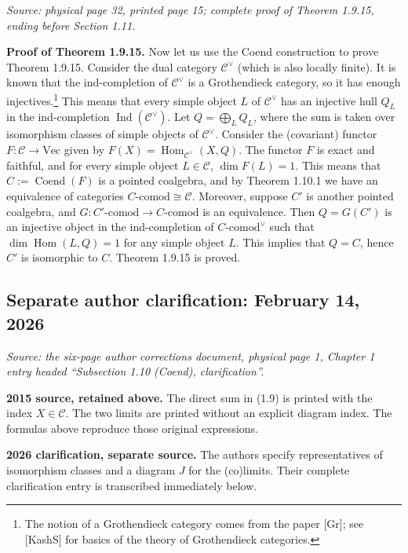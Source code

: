 \documentclass[11pt]{article}
\newcommand{\cC}{\mathcal{C}}
\newcommand{\FiniteVec}{\mathrm{Vec}}
\newcommand{\Coend}{\operatorname{Coend}}
\newcommand{\Hom}{\operatorname{Hom}}
\newcommand{\Ind}{\operatorname{Ind}}
\newcommand{\comod}{\mathrm{comod}}
\newcommand{\sourceloc}[1]{\par\smallskip\noindent\textit{Source: #1.}\par\smallskip}
\begin{document}
\sourceloc{physical page 32, printed page 15; complete proof of Theorem 1.9.15,
ending before Section 1.11}
\noindent\textbf{Proof of Theorem 1.9.15.}
Now let us use the Coend construction to prove Theorem 1.9.15.
Consider the dual category $\cC^{\vee}$ (which is also locally finite).
It is known that the ind-completion of $\cC^{\vee}$ is a Grothendieck
category, so it has enough injectives.\footnote[4]{The notion of a
Grothendieck category comes from the paper [Gr]; see [KashS] for basics
of the theory of Grothendieck categories.}
This means that every simple object $L$ of $\cC^{\vee}$ has an injective
hull $Q_L$ in the ind-completion $\Ind(\cC^{\vee})$.
Let $Q=\bigoplus_L Q_L$, where the sum is taken over isomorphism classes
of simple objects of $\cC^{\vee}$. Consider the (covariant) functor
$F:\cC\to\FiniteVec$ given by $F(X)=\Hom_{\cC^{\vee}}(X,Q)$.
The functor $F$ is exact and faithful, and for every simple object
$L\in\cC$, $\dim F(L)=1$. This means that $C:=\Coend(F)$ is a pointed
coalgebra, and by Theorem 1.10.1 we have an equivalence of categories
$C$-$\comod\cong\cC$. Moreover, suppose $C'$ is another pointed
coalgebra, and $G:C'$-$\comod\to C$-$\comod$ is an equivalence.
Then $Q=G(C')$ is an injective object in the ind-completion of
$C$-$\comod^{\vee}$ such that $\dim\Hom(L,Q)=1$ for any simple object $L$.
This implies that $Q=C$, hence $C'$ is isomorphic to $C$.
Theorem 1.9.15 is proved.

\clearpage
\subsection*{Separate author clarification: February 14, 2026}
\sourceloc{the six-page author corrections document, physical page 1,
Chapter 1 entry headed ``Subsection 1.10 (Coend), clarification''}
\noindent
\begin{minipage}[t]{0.47\linewidth}\raggedright
\textbf{2015 source, retained above.}
The direct sum in (1.9) is printed with the index $X\in\cC$.
The two limits are printed without an explicit diagram index.
The formulas above reproduce those original expressions.
\end{minipage}\hfill
\begin{minipage}[t]{0.47\linewidth}\raggedright
\textbf{2026 clarification, separate source.}
The authors specify representatives of isomorphism classes and a diagram
$J$ for the (co)limits. Their complete clarification entry is transcribed
immediately below.
\end{minipage}
\end{document}
